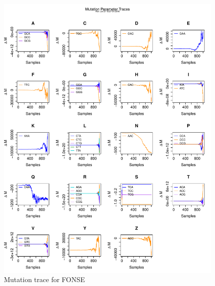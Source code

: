 \documentclass[11pt]{labbook}
\begin{document}
    \begin{figure}
        \centering
        \includegraphics[scale=.65]{FONSE_Plots/2016/June_27/Run1_MutationTrace}
        \caption{Mutation trace for FONSE}
        \label{fig:JUN27_FMUT}
    \end{figure}
\end{document}
